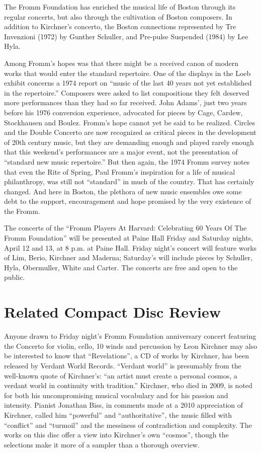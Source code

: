 The Fromm Foundation has enriched the musical life of Boston through its regular concerts, but also through the cultivation of Boston composers. In addition to Kirchner’s concerto, the Boston connections represented by Tre Invenzioni (1972) by Gunther Schuller, and Pre-pulse Suspended (1984) by Lee Hyla.

Among Fromm’s hopes was that there might be a received canon of modern works that would enter the standard repertoire. One of the displays in the Loeb exhibit concerns a 1974 report on “music of the last 40 years not yet established in the repertoire.” Composers were asked to list compositions they felt deserved more performances than they had so far received. John Adams’, just two years before his 1976 conversion experience, advocated for pieces by Cage, Cardew, Stockhausen and Boulez. Fromm’s hope cannot yet be said to be realized. Circles and the Double Concerto are now recognized as critical pieces in the development of 20th century music, but they are demanding enough and played rarely enough that this weekend’s performances are a major event, not the presentation of “standard new music repertoire.” But then again, the 1974 Fromm survey notes that even the Rite of Spring, Paul Fromm’s inspiration for a life of musical philanthropy, was still not “standard” in much of the country. That has certainly changed. And here in Boston, the plethora of new music ensembles owe some debt to the support, encouragement and hope promised by the very existence of the Fromm.

The concerts of the “Fromm Players At Harvard: Celebrating 60 Years Of The Fromm Foundation” will be presented at Paine Hall Friday and Saturday nights, April 12 and 13, at 8 p.m. at Paine Hall. Friday night’s concert will feature works of Lim, Berio, Kirchner and Maderna; Saturday’s will include pieces by Schuller, Hyla, Obermuller, White and Carter. The concerts are free and open to the public.

\section{Related Compact Disc Review}

Anyone drawn to Friday night’s Fromm Foundation anniversary concert featuring the Concerto for violin, cello, 10 winds and percussion by Leon Kirchner may also be interested to know that “Revelations”, a CD of works by Kirchner, has been released by Verdant World Records. “Verdant world” is presumably from the well-known quote of Kirchner’s: “an artist must create a personal cosmos, a verdant world in continuity with tradition.” Kirchner, who died in 2009, is noted for both his uncompromising musical vocabulary and for his passion and intensity. Pianist Jonathan Biss, in comments made at a 2010 appreciation of Kirchner, called him “powerful” and “authoritative”, the music filled with “conflict” and “turmoil” and the messiness of contradiction and complexity. The works on this disc offer a view into Kirchner’s own “cosmos”, though the selections make it more of a sampler than a thorough overview.

